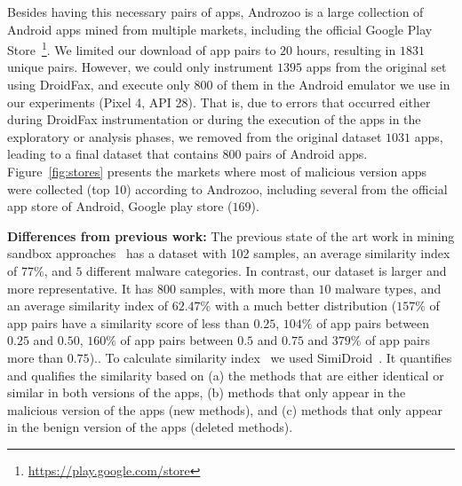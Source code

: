Besides having this necessary pairs of apps, Androzoo is a large collection of Android apps mined from multiple markets, including the official Google Play Store~\footnote{\url{https://play.google.com/store}}. We limited our download of app pairs to $20$ hours, resulting in $1831$ unique pairs. However, we could only instrument $1395$ apps from the original set using DroidFax, and execute only $800$ of them in the Android emulator we use in our experiments (Pixel 4, API 28). That is, due to errors that occurred either during DroidFax instrumentation or during the execution of the apps in the exploratory or analysis phases, we removed from the original dataset $1031$ apps, leading to a final dataset that contains $800$ pairs of Android apps. Figure~\ref{fig:stores} presents the markets where most of malicious version apps were collected (top 10) according to Androzoo, including several from the official app store of Android, Google play store ($169$).



\textbf{Differences from previous work: } The previous state of the art work in mining sandbox approaches~\cite{DBLP:conf/wcre/BaoLL18} has a dataset with 102 samples, an average similarity index of $77\%$, and $5$ different malware categories. In contrast, our dataset is larger and more representative. It has 800 samples, with more than $10$ malware types, and an average similarity index of $62.47\%$ with a much better distribution ($157\%$ of
app pairs have a similarity score of less than $0.25$, $104\%$ of app pairs between $0.25$ and $0.50$, $160\%$ of app pairs between $0.5$
and $0.75$  and $379\%$ of app pairs more than $0.75$).. To calculate similarity index~\cite{DBLP:conf/wcre/0029BKT16} we used SimiDroid~\cite{DBLP:conf/trustcom/0029BK17}. It quantifies and qualifies the similarity based on (a) the methods that are either identical or similar in both versions of the apps, (b) methods that only appear in the malicious version of the apps (new methods), and (c) methods that only appear in the benign version of the apps (deleted methods). 



